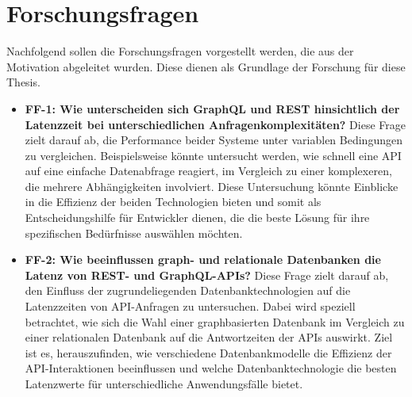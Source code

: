 \section{Forschungsfragen} %
\label{sec:forschungsfragen}
Nachfolgend sollen die Forschungsfragen vorgestellt werden, die aus der Motivation abgeleitet wurden. Diese dienen als Grundlage der Forschung für diese Thesis.
\newpage
\begin{itemize}
	\item \textbf{FF-1: Wie unterscheiden sich GraphQL und REST hinsichtlich der Latenzzeit bei unterschiedlichen Anfragenkomplexitäten?}  Diese Frage zielt darauf ab, die Performance beider Systeme unter variablen Bedingungen zu vergleichen. Beispielsweise könnte untersucht werden, wie schnell eine API auf eine einfache Datenabfrage reagiert, im Vergleich zu einer komplexeren, die mehrere Abhängigkeiten involviert. Diese Untersuchung könnte Einblicke in die Effizienz der beiden Technologien bieten und somit als Entscheidungshilfe für Entwickler dienen, die die beste Lösung für ihre spezifischen Bedürfnisse auswählen möchten.
	\item \textbf{FF-2: Wie beeinflussen graph- und relationale Datenbanken die Latenz von REST- und GraphQL-APIs?} Diese Frage zielt darauf ab, den Einfluss der zugrundeliegenden Datenbanktechnologien auf die Latenzzeiten von API-Anfragen zu untersuchen. Dabei wird speziell betrachtet, wie sich die Wahl einer graphbasierten Datenbank im Vergleich zu einer relationalen Datenbank auf die Antwortzeiten der APIs auswirkt. Ziel ist es, herauszufinden, wie verschiedene Datenbankmodelle die Effizienz der API-Interaktionen beeinflussen und welche Datenbanktechnologie die besten Latenzwerte für unterschiedliche Anwendungsfälle bietet.
\end{itemize}
